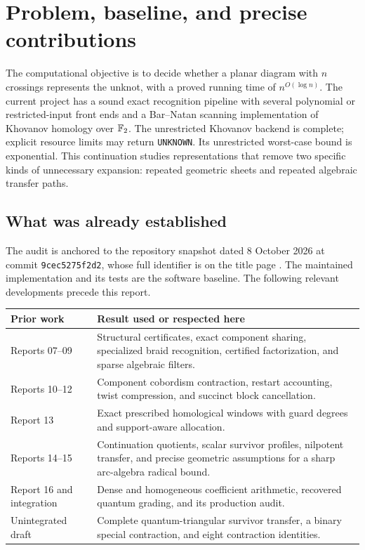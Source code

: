 \section{Problem, baseline, and precise contributions}
\label{sec:scope}

The computational objective is to decide whether a planar diagram with
$n$ crossings represents the unknot, with a proved running time of
$n^{O(\log n)}$. The current project has a sound exact recognition
pipeline with several polynomial or restricted-input front ends and
a Bar--Natan scanning implementation of Khovanov homology over $\mathbb F_2$.
The unrestricted Khovanov backend is complete; explicit resource limits
may return \texttt{UNKNOWN}. Its unrestricted worst-case bound is
exponential. This continuation
studies representations that remove two specific kinds of unnecessary
expansion: repeated geometric sheets and repeated algebraic transfer
paths.

\subsection{What was already established}

The audit is anchored to the repository snapshot dated 8 October 2026
at commit \texttt{9cec5275f2d2}, whose full identifier is on the title page
\cite{ProveItSnapshot2026}. The maintained implementation and its tests
are the software baseline. The
following relevant developments precede this report.

\begin{center}
\small
\begin{tabularx}{\textwidth}{@{}p{}X@{}}
\toprule
Prior work & Result used or respected here \\
\midrule
Reports 07--09 & Structural certificates, exact component sharing,
specialized braid recognition, certified factorization, and sparse
algebraic filters. \\
Reports 10--12 & Component cobordism contraction, restart accounting,
twist compression, and succinct block cancellation. \\
Report 13 & Exact prescribed homological windows with guard degrees and
support-aware allocation. \\
Reports 14--15 & Continuation quotients, scalar survivor profiles,
nilpotent transfer, and precise geometric assumptions for a sharp
arc-algebra radical bound. \\
Report 16 and integration & Dense and homogeneous coefficient
arithmetic, recovered quantum grading, and its production audit. \\
Unintegrated draft & Complete quantum-triangular survivor transfer,
a binary special contraction, and eight contraction identities. \\
\bottomrule
\end{tabularx}
\end{center}

